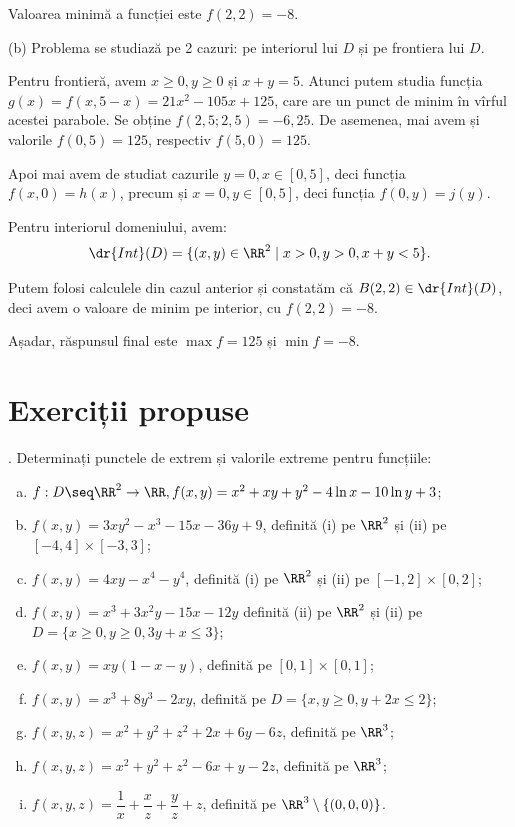 Valoarea minimă a funcției este $ f(2, 2) = -8 $.

\vspace{1cm}

(b) Problema se studiază pe 2 cazuri: pe interiorul lui $ D $ și pe frontiera lui $ D $.

Pentru frontieră, avem $ x \geq 0, y \geq 0 $ și $ x + y = 5 $. Atunci putem
studia funcția $ g(x) = f(x, 5-x) = 21x^2 - 105x + 125 $, care are un punct
de minim în vîrful acestei parabole. Se obține $ f(2,5; 2,5) = -6,25 $.
De asemenea, mai avem și valorile $ f(0, 5) = 125 $, respectiv $ f(5, 0) = 125 $.

Apoi mai avem de studiat cazurile $ y = 0, x \in [0, 5] $, deci funcția
$ f(x, 0) = h(x) $, precum și $ x = 0, y \in [0, 5] $, deci funcția
$ f(0, y) = j(y) $.

Pentru interiorul domeniului, avem:
\[
  \dr{Int}(D) = \{ (x, y) \in \RR^2 \mid x > 0, y > 0, x + y < 5 \}.
\]

Putem folosi calculele din cazul anterior și constatăm că $ B(2, 2) \in \dr{Int}(D) $,
deci avem o valoare de minim pe interior, cu $ f(2, 2) = -8 $.

Așadar, răspunsul final este $ \max f = 125 $ și $ \min f = -8 $.


\section{Exerciții propuse}

\indent{}. Determinați punctele de extrem și valorile extreme pentru funcțiile:
\begin{enumerate}[(a)]
\item $ f : D \seq \RR^2 \to \RR, f(x, y) = x^2 + xy + y^2 - 4 \ln x - 10\ln y + 3 $;
\item $ f(x, y) = 3xy^2 - x^3 - 15x - 36y + 9 $, definită (i) pe $ \RR^2 $
  și (ii) pe $ [-4,4] \times [-3, 3] $;
\item $ f(x, y) = 4xy - x^4 - y^4 $, definită (i) pe $ \RR^2 $ și (ii) pe
  $ [-1, 2] \times [0, 2] $;
\item $ f(x, y) = x^3 + 3x^2y - 15x - 12y $ definită (ii) pe $ \RR^2 $ și
  (ii) pe $ D = \{ x \geq 0, y \geq 0, 3y + x \leq 3 \} $;
\item $ f(x, y) = xy(1 - x - y) $, definită pe $ [0, 1] \times [0, 1] $;
\item $ f(x, y) = x^3 + 8y^3 - 2xy $, definită pe $ D = \{ x, y \geq 0, y + 2x \leq 2 \} $;
\item $ f(x, y, z) = x^2 + y^2 + z^2 + 2x + 6y - 6z $, definită pe $ \RR^3 $;
\item $ f(x, y, z) = x^2 + y^2 + z^2 - 6x + y - 2z $, definită pe $ \RR^3 $;
\item $ f(x, y, z) = \dfrac{1}{x} + \dfrac{x}{z} + \dfrac{y}{z} + z $, definită pe $ \RR^3 \setminus \{ (0,0,0) \} $.
\end{enumerate}
 
